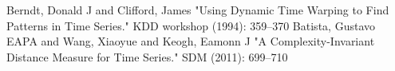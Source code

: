 \begin{thebibliography}{1}
     Berndt, Donald J and Clifford, James "Using Dynamic Time Warping to Find Patterns in
    Time Series." KDD workshop (1994): 359--370
     Batista, Gustavo EAPA and Wang, Xiaoyue and Keogh, Eamonn J "A
    Complexity-Invariant Distance Measure for Time Series." SDM (2011): 699--710
\end{thebibliography}
